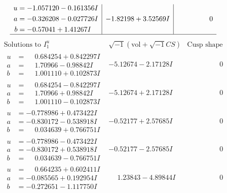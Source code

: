 \documentclass[1p]{elsarticle_modified}
\theoremstyle{definition}
\newcommand{\I}{\sqrt{-1}}
\begin{document}
$$\begin{array}{c|c|c}
\begin{aligned}
u &= -1.057120 - 0.161356 I \\
a &= -0.326208 - 0.027726 I \\
b &= -0.57041 + 1.41267 I\end{aligned}
 & -1.82198 + 3.52569 I & \phantom{-0.000000 } 0\\
 \hline 
 \end{array}$$\newpage$$\begin{array}{c|c|c}  
\text{Solutions to }I^u_{1}& \I (\text{vol} + \sqrt{-1}CS) & \text{Cusp shape}\\
 \hline 
\begin{aligned}
u &= \phantom{-}0.684254 + 0.842297 I \\
a &= \phantom{-}1.70966 - 0.98842 I \\
b &= \phantom{-}1.001110 + 0.102873 I\end{aligned}
 & -5.12674 - 2.17128 I & \phantom{-0.000000 } 0 \\ \hline\begin{aligned}
u &= \phantom{-}0.684254 - 0.842297 I \\
a &= \phantom{-}1.70966 + 0.98842 I \\
b &= \phantom{-}1.001110 - 0.102873 I\end{aligned}
 & -5.12674 + 2.17128 I & \phantom{-0.000000 } 0 \\ \hline\begin{aligned}
u &= -0.778986 + 0.473422 I \\
a &= -0.830172 - 0.538918 I \\
b &= \phantom{-}0.034639 + 0.766751 I\end{aligned}
 & -0.52177 + 2.57685 I & \phantom{-0.000000 } 0 \\ \hline\begin{aligned}
u &= -0.778986 - 0.473422 I \\
a &= -0.830172 + 0.538918 I \\
b &= \phantom{-}0.034639 - 0.766751 I\end{aligned}
 & -0.52177 - 2.57685 I & \phantom{-0.000000 } 0 \\ \hline\begin{aligned}
u &= \phantom{-}0.664235 + 0.602411 I \\
a &= -0.085565 + 0.192954 I \\
b &= -0.272651 - 1.117750 I\end{aligned}
 & \phantom{-}1.23843 - 4.89844 I & \phantom{-0.000000 } 0 \\ \hline\begin{aligned}

\end{aligned}
\end{array}$$
\end{document}
